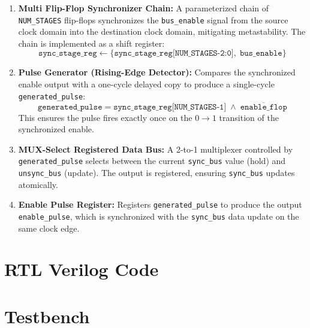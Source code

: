 \documentclass[12pt,a4paper]{article}
\begin{document}
\begin{enumerate}
    \item \textbf{Multi Flip-Flop Synchronizer Chain:} A parameterized chain of \texttt{NUM\_STAGES} flip-flops synchronizes the \texttt{bus\_enable} signal from the source clock domain into the destination clock domain, mitigating metastability. The chain is implemented as a shift register:
    \[
        \texttt{sync\_stage\_reg} \leftarrow \{\texttt{sync\_stage\_reg[NUM\_STAGES-2:0]},\; \texttt{bus\_enable}\}
    \]
    
    \item \textbf{Pulse Generator (Rising-Edge Detector):} Compares the synchronized enable output with a one-cycle delayed copy to produce a single-cycle \texttt{generated\_pulse}:
    \[
        \texttt{generated\_pulse} = \texttt{sync\_stage\_reg[NUM\_STAGES-1]} \;\land\; \overline{\texttt{enable\_flop}}
    \]
    This ensures the pulse fires exactly once on the $0 \to 1$ transition of the synchronized enable.
    
    \item \textbf{MUX-Select Registered Data Bus:} A 2-to-1 multiplexer controlled by \texttt{generated\_pulse} selects between the current \texttt{sync\_bus} value (hold) and \texttt{unsync\_bus} (update). The output is registered, ensuring \texttt{sync\_bus} updates atomically.
    
    \item \textbf{Enable Pulse Register:} Registers \texttt{generated\_pulse} to produce the output \texttt{enable\_pulse}, which is synchronized with the \texttt{sync\_bus} data update on the same clock edge.
\end{enumerate}

\section{RTL Verilog Code}



\section{Testbench}
\end{document}

